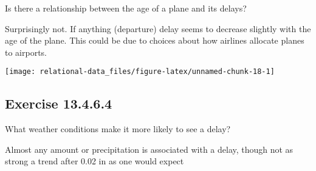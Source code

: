 \documentclass[]{book}
\newenvironment{Shaded}{\begin{snugshade}}{\end{snugshade}}
\newcommand{\CommentTok}[1]{\textcolor[rgb]{0.56,0.35,0.01}{\textit{#1}}}
\newcommand{\DataTypeTok}[1]{\textcolor[rgb]{0.13,0.29,0.53}{#1}}
\newcommand{\DecValTok}[1]{\textcolor[rgb]{0.00,0.00,0.81}{#1}}
\newcommand{\KeywordTok}[1]{\textcolor[rgb]{0.13,0.29,0.53}{\textbf{#1}}}
\newcommand{\NormalTok}[1]{#1}
\newcommand{\OperatorTok}[1]{\textcolor[rgb]{0.81,0.36,0.00}{\textbf{#1}}}
\newcommand{\StringTok}[1]{\textcolor[rgb]{0.31,0.60,0.02}{#1}}
\theoremstyle{plain}
\theoremstyle{remark}
\begin{document}
Is there a relationship between the age of a plane and its delays?

Surprisingly not. If anything (departure) delay seems to decrease
slightly with the age of the plane. This could be due to choices about
how airlines allocate planes to airports.

\begin{Shaded}
\end{Shaded}

\begin{center}\texttt{[image: relational-data\_files/figure-latex/unnamed-chunk-18-1]} \end{center}

\hypertarget{exercise-13.4.6.4}{%
\subsection*{\texorpdfstring{Exercise
{13.4.6.4}}{Exercise 13.4.6.4}}\label{exercise-13.4.6.4}}

What weather conditions make it more likely to see a delay?

Almost any amount or precipitation is associated with a delay, though
not as strong a trend after 0.02 in as one would expect
\end{document}
